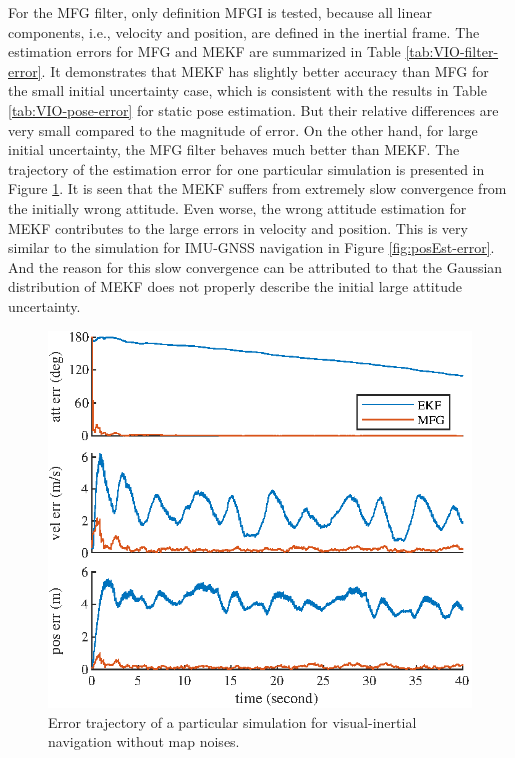 For the MFG filter, only definition MFGI is tested, because all linear components, i.e., velocity and position, are defined in the inertial frame.
The estimation errors for MFG and MEKF are summarized in Table \ref{tab:VIO-filter-error}.
It demonstrates that MEKF has slightly better accuracy than MFG for the small initial uncertainty case, which is consistent with the results in Table \eqref{tab:VIO-pose-error} for static pose estimation.
But their relative differences are very small compared to the magnitude of error.
On the other hand, for large initial uncertainty, the MFG filter behaves much better than MEKF.
The trajectory of the estimation error for one particular simulation is presented in Figure \ref{fig:VIO-filter-error}.
It is seen that the MEKF suffers from extremely slow convergence from the initially wrong attitude.
Even worse, the wrong attitude estimation for MEKF contributes to the large errors in velocity and position.
This is very similar to the simulation for IMU-GNSS navigation in Figure \ref{fig:posEst-error}.
And the reason for this slow convergence can be attributed to that the Gaussian distribution of MEKF does not properly describe the initial large attitude uncertainty.

\begin{figure}
	\centering
	\includegraphics[scale=1.3]{figures/VIO-filter-error}
	\caption{Error trajectory of a particular simulation for visual-inertial navigation without map noises.}
	\label{fig:VIO-filter-error}
\end{figure}

